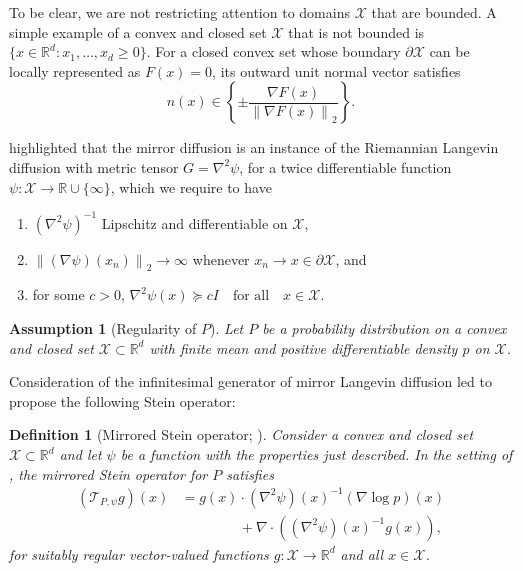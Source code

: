 \documentclass[12pt,paper=letter]{scrreprt}
\newtheorem{definition}{Definition}[chapter]
\newcommand{\qtext}[1]{\quad\text{#1}\quad}
\def\reals{\mathbb{R}} %
\newcommand{\psdge}{\succcurlyeq}
\def\norm#1{\left\|{#1}\right\|} %
\newcommand{\twonorm}[1]{\norm{#1}_2} %
\newcommand{\Hess}{\nabla^2} %
\newtheorem{assumption}{Assumption}[chapter]
\newcommand{\xset}[0]{\mathcal{X}} %
\begin{document}
To be clear, we are not restricting attention to domains $\xset$ that are bounded.
A simple example of a convex and closed set $\xset$ that is not bounded is $\{x \in \reals^d : x_1,\dots,x_d \geq 0\}$.
For a closed convex set whose boundary $\partial \xset$ can be locally represented as $F(x) = 0$, its outward unit normal vector satisfies
$$
n(x) \in \left\{\pm \frac{\nabla F(x)}{\twonorm{\nabla F(x)}} \right\}.
$$

\citet{zhang2020wasserstein} highlighted that the mirror diffusion is an instance of the Riemannian Langevin diffusion with metric tensor $G = \nabla^2 \psi$, for a twice differentiable function $\psi : \xset \rightarrow \reals \cup \{\infty\}$, which we require to have 
\begin{enumerate}
    \item $(\nabla^2 \psi)^{-1}$ Lipschitz and differentiable on $\xset$, 
    \item $\twonorm{(\nabla \psi)(x_n)} \rightarrow \infty$ whenever $x_n \rightarrow x \in \partial \xset$, and
    \item for some $c > 0$, $\Hess \psi(x) \psdge c I \qtext{for all} x \in \xset.$ %
\end{enumerate}

\begin{assumption}[Regularity of $P$]
\label{ass: reg mirror}
    Let $P$ be a probability distribution on a convex and closed set $\xset \subset \reals^d$ with finite mean and positive differentiable density $p$ on $\xset$. %
\end{assumption}

Consideration of the infinitesimal generator of mirror Langevin diffusion led \citet{shi2022sampling} to propose the following Stein operator:

\begin{definition}[Mirrored Stein operator; \citealp{shi2022sampling}]
\label{def: mirrored stein operator}
    Consider a convex and closed set $\xset \subset \reals^d$ and let $\psi$ be a function with the properties just described.
    In the setting of , the \emph{mirrored Stein operator} for $P$ satisfies
    \begin{align} \label{eq:mirror-stein-op}
	(\mathcal{T}_{P,\psi} g)(x) & = g(x) \cdot (\nabla^2\psi)(x)^{-1} (\nabla \log p)(x) \\
    & \hspace{50pt} + \nabla\cdot ((\nabla^2\psi)(x)^{-1}g(x)), \nonumber
    \end{align}    
    for suitably regular vector-valued functions $g: \xset \to \reals^d$ and all $x \in \xset$.
\end{definition}
\end{document}
